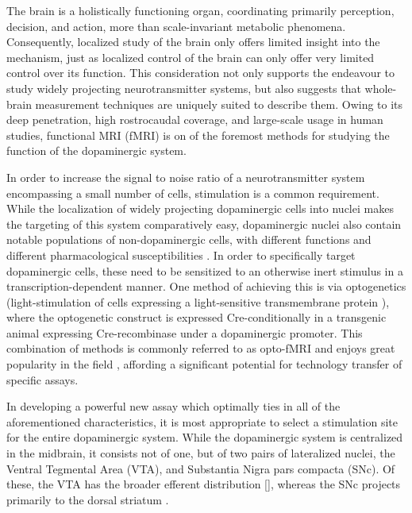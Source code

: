 The brain is a holistically functioning organ, coordinating primarily perception, decision, and action, more than scale-invariant metabolic phenomena.
Consequently, localized study of the brain only offers limited insight into the mechanism, just as localized control of the brain can only offer very limited control over its function.
This consideration not only supports the endeavour to study widely projecting neurotransmitter systems, but also suggests that whole-brain measurement techniques are uniquely suited to describe them.
Owing to its deep penetration, high rostrocaudal coverage, and large-scale usage in human studies, functional MRI (fMRI) is on of the foremost methods for studying the function of the dopaminergic system.

In order to increase the signal to noise ratio of a neurotransmitter system encompassing a small number of cells, stimulation is a common requirement.
While the localization of widely projecting dopaminergic cells into nuclei makes the targeting of this system comparatively easy, dopaminergic nuclei also contain notable populations of non-dopaminergic cells, with different functions and different pharmacological susceptibilities \cite{Taylor2014}.
In order to specifically target dopaminergic cells, these need to be sensitized to an otherwise inert stimulus in a transcription-dependent manner.
One method of achieving this is via optogenetics (light-stimulation of cells expressing a light-sensitive transmembrane protein \cite{Boyden2005}), where the optogenetic construct is expressed Cre-conditionally \cite{Orban1992} in a transgenic animal expressing Cre-recombinase under a dopaminergic promoter.
This combination of methods is commonly referred to as opto-fMRI and enjoys great popularity in the field \cite{Desai2011,Grandjean2019}, affording a significant potential for technology transfer of specific assays.

In developing a powerful new assay which optimally ties in all of the aforementioned characteristics, it is most appropriate to select a stimulation site for the entire dopaminergic system.
While the dopaminergic system is centralized in the midbrain, it consists not of one, but of two pairs of lateralized nuclei, the Ventral Tegmental Area (VTA), and Substantia Nigra pars compacta (SNc).
Of these, the VTA has the broader efferent distribution \cref{}, whereas the SNc projects primarily to the dorsal striatum \cite{Pan2010}.

